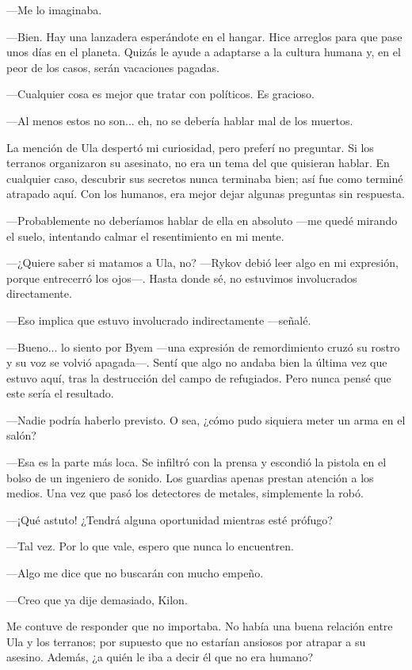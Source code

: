 —Me lo imaginaba.

—Bien. Hay una lanzadera esperándote en el hangar. Hice arreglos para que pase unos días en el planeta. Quizás le ayude a adaptarse a la cultura humana y, en el peor de los casos, serán vacaciones pagadas.

—Cualquier cosa es mejor que tratar con políticos. Es gracioso.

—Al menos estos no son... eh, no se debería hablar mal de los muertos.

La mención de Ula despertó mi curiosidad, pero preferí no preguntar. Si los terranos organizaron su asesinato, no era un tema del que quisieran hablar. En cualquier caso, descubrir sus secretos nunca terminaba bien; así fue como terminé atrapado aquí. Con los humanos, era mejor dejar algunas preguntas sin respuesta.

—Probablemente no deberíamos hablar de ella en absoluto —me quedé mirando el suelo, intentando calmar el resentimiento en mi mente.

 —¿Quiere saber si matamos a Ula, no? —Rykov debió leer algo en mi expresión, porque entrecerró los ojos—. Hasta donde sé, no estuvimos involucrados directamente.

—Eso implica que estuvo involucrado indirectamente —señalé.

—Bueno... lo siento por Byem —una expresión de remordimiento cruzó su rostro y su voz se volvió apagada—. Sentí que algo no andaba bien la última vez que estuvo aquí, tras la destrucción del campo de refugiados. Pero nunca pensé que este sería el resultado.

—Nadie podría haberlo previsto. O sea, ¿cómo pudo siquiera meter un arma en el salón?

—Esa es la parte más loca. Se infiltró con la prensa y escondió la pistola en el bolso de un ingeniero de sonido. Los guardias apenas prestan atención a los medios. Una vez que pasó los detectores de metales, simplemente la robó.

—¡Qué astuto! ¿Tendrá alguna oportunidad mientras esté prófugo?

—Tal vez. Por lo que vale, espero que nunca lo encuentren.

—Algo me dice que no buscarán con mucho empeño.

—Creo que ya dije demasiado, Kilon.

Me contuve de responder que no importaba. No había una buena relación entre Ula y los terranos; por supuesto que no estarían ansiosos por atrapar a su asesino. Además, ¿a quién le iba a decir él que no era humano?

